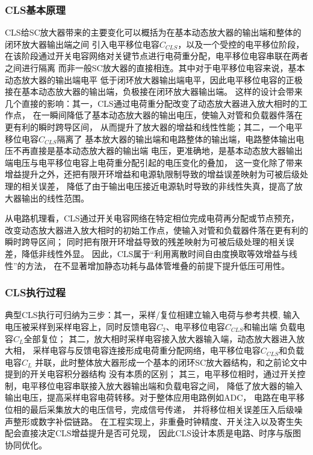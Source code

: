\subsubsection{CLS基本原理}
CLS给SC放大器带来的主要变化可以概括为在基本动态放大器的输出端和整体的闭环放大器输出端之间
引入电平移位电容$C_{CLS}$，以及一个受控的电平移位阶段，
在该阶段通过开关电容网络对关键节点进行电荷重分配，电平移位电容串联在两者之间进行隔离
而非一般SC放大器的直接相连。其中对于电平移位电容来说，基本动态放大器的输出端电平
低于闭环放大器输出端电平，因此电平移位电容的正极接在基本动态放大器的输出端，负极接在闭环放大器输出端。
这样的设计会带来几个直接的影响：其一，CLS通过电荷重分配改变了动态放大器进入放大相时的工作点，
在一瞬间降低了基本动态放大器的输出电压，使输入对管和负载器件落在更有利的瞬时跨导区间，
从而提升了放大器的增益和线性性能；其二，一个电平移位电容${C_{CLS}}$隔离了
基本放大器的输出端和电路整体的输出端，电路整体输出电压不再直接是基本动态放大器的输出端
电压，更准确地，是基本动态放大器输出端电压与电平移位电容上电荷重分配引起的电压变化的叠加，
这一变化除了带来增益提升之外，还把有限开环增益和电源轨限制导致的增益误差映射为可被后级处理的相关误差，
降低了由于输出电压接近电源轨时导致的非线性失真，提高了放大器输出的线性范围。
\par
从电路机理看，CLS通过开关电容网络在特定相位完成电荷再分配或节点预充，
改变动态放大器进入放大相时的初始工作点，使输入对管和负载器件落在更有利的瞬时跨导区间；
同时把有限开环增益导致的残差映射为可被后级处理的相关误差，降低非线性外显\cite{hung2016averagingcls,kumar2022cascodedfia}。
因此，CLS属于“利用离散时间自由度换取等效增益与线性”的方法，
在不显著增加静态功耗与晶体管堆叠的前提下提升低压可用性\cite{hu2022mashcls,meng2023jssc_mash}。

\subsubsection{CLS执行过程}

典型CLS执行可归纳为三步：其一，采样/复位相建立输入电荷与参考共模,
输入电压被采样到采样电容上，同时反馈电容${C_2}$、电平移位电容${C_{CLS}}$和输出端
负载电容${C_L}$全部复位；
其二，放大相时采样电容接入放大器输入端，动态放大器进入放大相，
采样电容与反馈电容连接形成电荷重分配网络，电平移位电容${C_{CLS}}$和负载电容${C_L}$
并联，此时整体放大器形成一个基本的闭环SC放大器结构，和之前论文中提到的开关电容积分器结构
没有本质的区别；
其三，电平移位相时，通过开关控制，电平移位电容串联接入放大器输出端和负载电容之间，
降低了放大器的输入输出电压，提高采样电容电荷转移。对于整体应用电路例如ADC，
电路在电平移位相的最后采集放大的电压信号，完成信号传递，
并将移位相关误差压入后级噪声整形或数字补偿链路\cite{essam2010twophasecls,li2024crcls}。
在工程实现上，非重叠时钟精度、开关注入以及寄生失配会直接决定CLS增益提升是否可兑现，
因此CLS设计本质是电路、时序与版图协同优化\cite{hung2016averagingcls,liu2020pingpongcls}。


